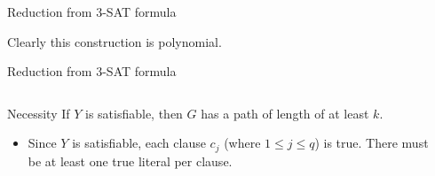 \begin{frame}{Reduction from 3-SAT formula}

Clearly this construction is polynomial.  




\end{frame}

\begin{frame}{Reduction from 3-SAT formula}
\begin{columns}
\begin{column}{0.45\textwidth}
\begin{block}{Necessity}
If $Y$ is satisfiable, then $G$ has a path of length of at least $k$.
\end{block}


  \begin{itemize} 
        \item<1-> Since $Y$ is satisfiable, each clause $c_j$ (where $1 \leq j \leq q$) is true. There must be at least one true literal per clause.
        
\end{itemize}
\end{column}
\begin{column}{0.55\textwidth}
    \begin{overlayarea}{0.55\textwidth}{8cm}
    \end{overlayarea}
\end{column}
\end{columns}
\end{frame}

